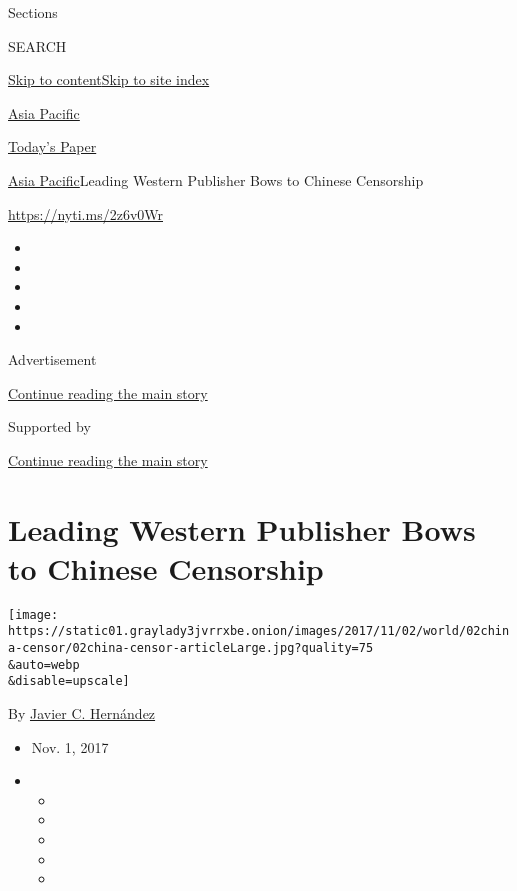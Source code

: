 Sections

SEARCH

\protect\hyperlink{site-content}{Skip to
content}\protect\hyperlink{site-index}{Skip to site index}

\href{https://www.nytimes3xbfgragh.onion/section/world/asia}{Asia
Pacific}

\href{https://myaccount.nytimes3xbfgragh.onion/auth/login?response_type=cookie\&client_id=vi}{}

\href{https://www.nytimes3xbfgragh.onion/section/todayspaper}{Today's
Paper}

\href{/section/world/asia}{Asia Pacific}\textbar{}Leading Western
Publisher Bows to Chinese Censorship

\url{https://nyti.ms/2z6v0Wr}

\begin{itemize}
\item
\item
\item
\item
\item
\end{itemize}

Advertisement

\protect\hyperlink{after-top}{Continue reading the main story}

Supported by

\protect\hyperlink{after-sponsor}{Continue reading the main story}

\hypertarget{leading-western-publisher-bows-to-chinese-censorship}{%
\section{Leading Western Publisher Bows to Chinese
Censorship}\label{leading-western-publisher-bows-to-chinese-censorship}}

\texttt{[image: https://static01.graylady3jvrrxbe.onion/images/2017/11/02/world/02china-censor/02china-censor-articleLarge.jpg?quality=75\\\&auto=webp\\\&disable=upscale]}

By
\href{https://www.nytimes3xbfgragh.onion/by/javier-c-hernandez}{Javier
C. Hernández}

\begin{itemize}
\item
  Nov. 1, 2017
\item
  \begin{itemize}
  \item
  \item
  \item
  \item
  \item
  \end{itemize}
\end{itemize}

